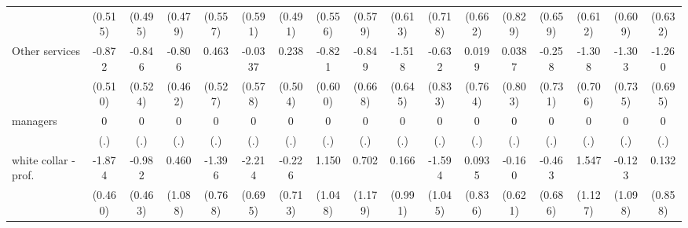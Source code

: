 {\begin{tabular}{l*{16}{c}}
                    &     (0.515)         &     (0.495)         &     (0.479)         &     (0.557)         &     (0.591)         &     (0.491)         &     (0.556)         &     (0.579)         &     (0.613)         &     (0.718)         &     (0.662)         &     (0.829)         &     (0.659)         &     (0.612)         &     (0.609)         &     (0.632)         \\
[1em]
Other services      &      -0.872         &      -0.846         &      -0.806         &       0.463         &     -0.0337         &       0.238         &      -0.821         &      -0.849         &      -1.518\sym{*}  &      -0.632         &      0.0199         &      0.0387         &      -0.258         &      -1.308         &      -1.303         &      -1.260         \\
                    &     (0.510)         &     (0.524)         &     (0.462)         &     (0.527)         &     (0.578)         &     (0.504)         &     (0.600)         &     (0.668)         &     (0.645)         &     (0.833)         &     (0.764)         &     (0.803)         &     (0.731)         &     (0.706)         &     (0.735)         &     (0.695)         \\
[1em]
managers            &           0         &           0         &           0         &           0         &           0         &           0         &           0         &           0         &           0         &           0         &           0         &           0         &           0         &           0         &           0         &           0         \\
                    &         (.)         &         (.)         &         (.)         &         (.)         &         (.)         &         (.)         &         (.)         &         (.)         &         (.)         &         (.)         &         (.)         &         (.)         &         (.)         &         (.)         &         (.)         &         (.)         \\
[1em]
white collar - prof.&      -1.874\sym{***}&      -0.982\sym{*}  &       0.460         &      -1.396         &      -2.214\sym{**} &      -0.226         &       1.150         &       0.702         &       0.166         &      -1.594         &      0.0935         &      -0.160         &      -0.463         &       1.547         &      -0.123         &       0.132         \\
                    &     (0.460)         &     (0.463)         &     (1.088)         &     (0.768)         &     (0.695)         &     (0.713)         &     (1.048)         &     (1.179)         &     (0.991)         &     (1.045)         &     (0.836)         &     (0.621)         &     (0.686)         &     (1.127)         &     (1.098)         &     (0.858)         \\

\end{tabular}}
